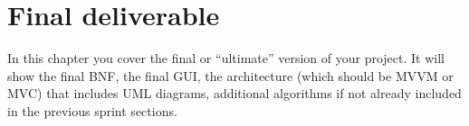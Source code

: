 \documentclass[a4paper, oneside, 11pt]{report}
\begin{document}
    \clearpage




    \chapter{Final deliverable}\label{Impl}

    In this chapter you cover the final or ``ultimate'' version of your project. It will show the final BNF, the final GUI, the architecture (which should be MVVM or MVC) that includes UML diagrams, additional algorithms if not already included in the previous sprint sections.
\end{document}

